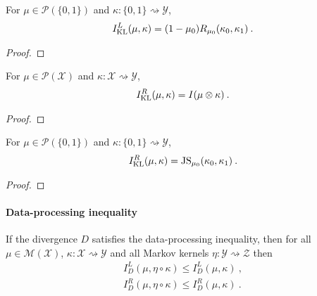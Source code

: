 \begin{lemma}
  \label{lem:mutualInfoLeft_eq_renyi}
  For $\mu \in \mathcal P(\{0,1\})$ and $\kappa : \{0,1\} \rightsquigarrow \mathcal Y$,
  \begin{align*}
  I_{\operatorname{KL}}^L(\mu, \kappa) = (1 - \mu_0) R_{\mu_0}(\kappa_0, \kappa_1) \: .
  \end{align*}
\end{lemma}

\begin{proof}%
{}

\end{proof}


\begin{lemma}
  \label{lem:mutualInfoRight_eq_mutualInfo}
  For $\mu \in \mathcal P(\mathcal X)$ and $\kappa : \mathcal X \rightsquigarrow \mathcal Y$,
  \begin{align*}
  I_{\operatorname{KL}}^R(\mu, \kappa) = I(\mu \otimes \kappa) \: .
  \end{align*}
\end{lemma}

\begin{proof}%
\uses{}

\end{proof}


\begin{corollary}
  \label{cor:mutualInfoRight_eq_jensenShannon}
  For $\mu \in \mathcal P(\{0,1\})$ and $\kappa : \{0,1\} \rightsquigarrow \mathcal Y$,
  \begin{align*}
  I_{\operatorname{KL}}^R(\mu, \kappa) = \operatorname{JS}_{\mu_0}(\kappa_0, \kappa_1) \: .
  \end{align*}
\end{corollary}

\begin{proof}%
{}

\end{proof}



\paragraph{Data-processing inequality}


\begin{theorem}
  \label{thm:mutualInfoLeft_comp_le}
  If the divergence $D$ satisfies the data-processing inequality, then for all $\mu \in \mathcal M(\mathcal X)$, $\kappa : \mathcal X \rightsquigarrow \mathcal Y$ and all Markov kernels $\eta : \mathcal Y \rightsquigarrow \mathcal Z$ then
  \begin{align*}
  I_D^L(\mu, \eta \circ \kappa) \le I_D^L(\mu, \kappa)
  \: , \\
  I_D^R(\mu, \eta \circ \kappa) \le I_D^R(\mu, \kappa)
  \: .
  \end{align*}
  
\end{theorem}


